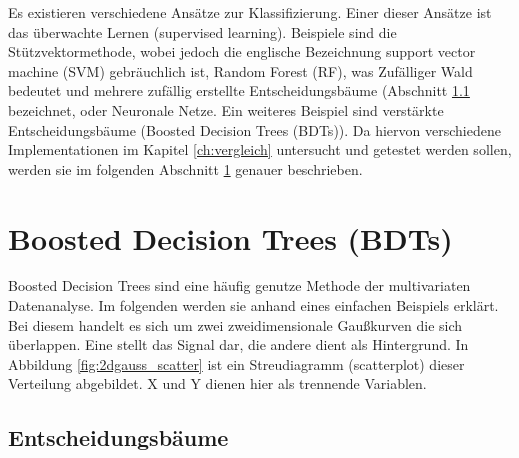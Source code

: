 Es existieren verschiedene Ans\"atze zur Klassifizierung. Einer dieser Ans\"atze ist das \"uberwachte Lernen (supervised learning). Beispiele sind die St\"utzvektormethode, wobei jedoch die englische Bezeichnung support vector machine (SVM) gebr\"auchlich ist, Random Forest (RF), was Zuf\"alliger Wald bedeutet und mehrere zuf\"allig erstellte Entscheidungsb\"aume (Abschnitt \ref{ch:Algorithmen:subsec:Entscheidungsbaum} bezeichnet, oder Neuronale Netze. Ein weiteres Beispiel sind verst\"arkte Entscheidungsb\"aume (Boosted Decision Trees (BDTs)). Da hiervon verschiedene Implementationen im Kapitel \ref{ch:vergleich} untersucht und getestet werden sollen, werden sie im folgenden Abschnitt \ref{ch:Algorithmen:sec:BDT} genauer beschrieben.

\section{Boosted Decision Trees (BDTs)}
\label{ch:Algorithmen:sec:BDT}

Boosted Decision Trees sind eine h\"aufig genutze Methode der multivariaten Datenanalyse. Im folgenden werden sie anhand eines einfachen Beispiels erkl\"art. Bei diesem handelt es sich um zwei zweidimensionale Gau\ss kurven die sich \"uberlappen. Eine stellt das Signal dar, die andere dient als Hintergrund. In Abbildung \ref{fig:2dgauss_scatter} ist ein Streudiagramm (scatterplot) dieser Verteilung abgebildet. X und Y dienen hier als trennende Variablen.

\subsection{Entscheidungsb\"aume}
\label{ch:Algorithmen:subsec:Entscheidungsbaum}

